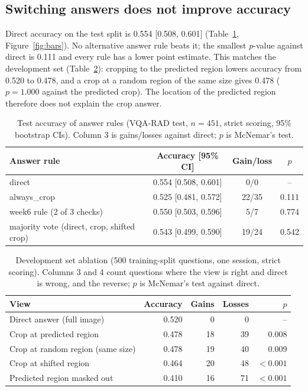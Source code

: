 \documentclass[11pt]{article}
\begin{document}
\subsection{Switching answers does not improve accuracy}
Direct accuracy on the test split is 0.554 [0.508, 0.601] (Table~\ref{tab:rules}, Figure~\ref{fig:bars}). No alternative answer rule beats it; the smallest $p$-value against direct is 0.111 and every rule has a lower point estimate. This matches the development set (Table~\ref{tab:dev}): cropping to the predicted region lowers accuracy from 0.520 to 0.478, and a crop at a random region of the same size gives 0.478 ($p=1.000$ against the predicted crop). The location of the predicted region therefore does not explain the crop answer.

\begin{table}[t]
\centering\small
\caption{Test accuracy of answer rules (VQA-RAD test, $n=451$, strict scoring, 95\% bootstrap CIs). Column 3 is gains/losses against direct; $p$ is McNemar's test.}\label{tab:rules}
\begin{tabular}{lccc}
\toprule
Answer rule & Accuracy [95\% CI] & Gain/loss & $p$ \\
\midrule
direct & 0.554 [0.508, 0.601] & 0/0 & -- \\
always\_crop & 0.525 [0.481, 0.572] & 22/35 & 0.111 \\
week6 rule (2 of 3 checks) & 0.550 [0.503, 0.596] & 5/7 & 0.774 \\
majority vote (direct, crop, shifted crop) & 0.543 [0.499, 0.590] & 19/24 & 0.542 \\
\bottomrule
\end{tabular}
\end{table}

\begin{table}[t]
\centering\small
\caption{Development set ablation (500 training-split questions, one session, strict scoring). Columns 3 and 4 count questions where the view is right and direct is wrong, and the reverse; $p$ is McNemar's test against direct.}\label{tab:dev}
\begin{tabular}{lrrrr}
\toprule
View & Accuracy & Gains & Losses & $p$ \\
\midrule
Direct answer (full image) & 0.520 & 0 & 0 & -- \\
Crop at predicted region & 0.478 & 18 & 39 & 0.008 \\
Crop at random region (same size) & 0.478 & 19 & 40 & 0.009 \\
Crop at shifted region & 0.464 & 20 & 48 & $<0.001$ \\
Predicted region masked out & 0.410 & 16 & 71 & $<0.001$ \\
\bottomrule
\end{tabular}
\end{table}
\end{document}
